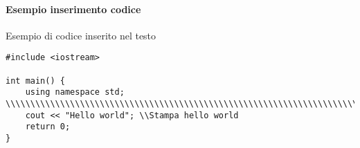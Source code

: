 \documentclass[12pt]{article} %
\begin{document}
\paragraph{Esempio inserimento codice}
	Esempio di codice inserito nel testo
\begin{verbatim}
#include <iostream>

int main() {
	using namespace std; \\\\\\\\\\\\\\\\\\\\\\\\\\\\\\\\\\\\\\\\\\\\\\\\\\\\\\\\\\\\\\\\\\\\\\\\\\\\\\\\\\\\\\\\\\\\\\\\\\\\\
	cout << "Hello world"; \\Stampa hello world
	return 0;
}
\end{verbatim}
\end{document}
